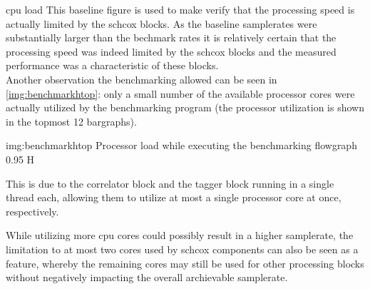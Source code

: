 \begin{subchapter}{\Acrshort{cpu} load}
  This baseline figure is used to make verify that the
  processing speed is actually limited by the \gls{schcox} blocks.
  As the baseline samplerates were substantially larger
  than the bechmark rates it is relatively certain that
  the processing speed was indeed limited by the \gls{schcox} blocks
  and the measured performance was a characteristic of these blocks. \\

  Another observation the benchmarking allowed can be seen
  in \autoref{img:benchmarkhtop}: only a small number of the available
  processor cores were actually utilized by the benchmarking program
  (the processor utilization is shown in the topmost 12 bargraphs).

                  {img:benchmarkhtop}
                  {Processor load while executing the benchmarking flowgraph}
                  {0.95}
                  {H}

  This is due to the correlator block and the tagger block running
  in a single thread each, allowing them to utilize at most
  a single processor core at once, respectively.

  While utilizing more \gls{cpu} cores could possibly
  result in a higher samplerate, the limitation to at most
  two cores used by \gls{schcox} components can
  also be seen as a feature, whereby the remaining cores
  may still be used for other processing blocks without
  negatively impacting the overall archievable samplerate.
\end{subchapter}
